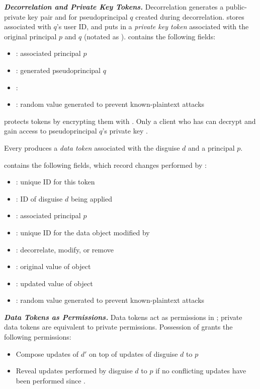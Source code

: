 \noindent\textbf{\emph{Decorrelation and Private Key Tokens.}}
Decorrelation generates a public-private key pair  and  for pseudoprincipal $q$
created during decorrelation.
\sys stores  associated with $q$'s user ID, and puts  in a \emph{private key token}
associated with the original principal $p$ and $q$  (notated as ).  contains the following fields:
\begin{itemize}
\item {}: associated principal $p$
\item {}: generated pseudoprincipal $q$
\item {}: 
\item {}: random value generated to prevent known-plaintext attacks
\end{itemize}

\noindent \sys protects  tokens by encrypting them with . Only a client who has
 can decrypt  and gain access to pseudoprincipal $q$'s private key .

Every  produces a \emph{data token}  associated with the disguise $d$ and a
principal $p$. 

 contains the following fields, which record changes performed by :
%
\begin{itemize}
\item {}: unique ID for this token
\item {}: ID of disguise $d$ being applied
\item {}: associated principal $p$
\item {}: unique ID for the data object modified by 
\item {}: decorrelate, modify, or remove
\item {}: original value of object 
\item {}: updated value of object 
\item {}: random value generated to prevent known-plaintext attacks
\end{itemize}

\noindent\textbf{\emph{Data Tokens as Permissions.}}
Data tokens act as permissions in \sys; private data tokens are equivalent to private permissions.
%
Possession of  grants the following permissions:
\begin{itemize}
    \item Compose updates of $d'$ on top of updates of disguise $d$ to $p$
    \item Reveal updates performed by disguise $d$ to $p$ if no conflicting updates have been
        performed since
.
\end{itemize}

